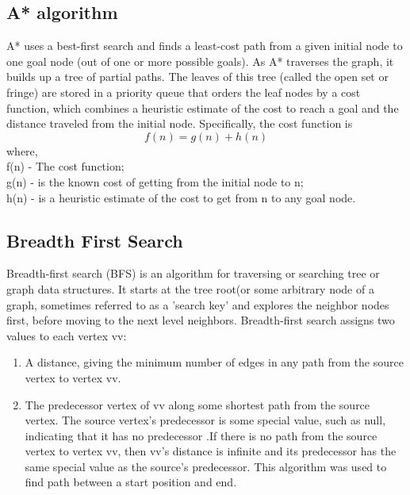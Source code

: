 \subsection{A* algorithm}
A* uses a best-first search and finds a least-cost path from a given initial node to one
goal node (out of one or more possible goals). As A* traverses the graph, it builds up
a tree of partial paths. The leaves of this tree (called the open set or fringe) are stored
in a priority queue that orders the leaf nodes by a cost function, which combines a
heuristic estimate of the cost to reach a goal and the distance traveled from the initial
node. Specifically, the cost function is\\
\begin{equation}
                                                                         		f(n)=g(n)+h(n) 
                                                                      \end{equation}
                                                                       \label{eq:Force} 		                                        
\justify where,\\
f(n) - The cost function;\\
g(n) - is the known cost of getting from the initial node to n;\\
h(n) - is a heuristic estimate of the cost to get from n to any goal node.
\subsection{Breadth First Search}
Breadth-first search (BFS) is an algorithm for traversing or searching tree or graph
data structures. It starts at the tree root(or some arbitrary node of a graph, sometimes referred to as a ’search key’ and explores the neighbor nodes first, before moving
to the next level neighbors. Breadth-first search assigns two values to each vertex vv:
\begin{enumerate}
\item A distance, giving the minimum number of edges in any path from the source
vertex to vertex vv.
\item The predecessor vertex of vv along some shortest path from the source vertex.
The source vertex’s predecessor is some special value, such as null, indicating
that it has no predecessor .If there is no path from the source vertex to vertex vv,
then vv’s distance is infinite and its predecessor has the same special value as
the source’s predecessor. This algorithm was used to find path between a start
position and end.
\end{enumerate}

